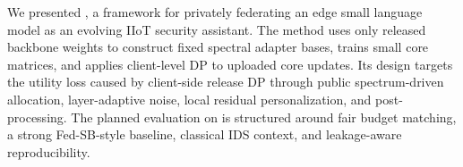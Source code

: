 We presented \method, a framework for privately federating an edge small language model as an evolving IIoT security assistant. The method uses only released backbone weights to construct fixed spectral adapter bases, trains small core matrices, and applies client-level DP to uploaded core updates. Its design targets the utility loss caused by client-side release DP through public spectrum-driven allocation, layer-adaptive noise, local residual personalization, and post-processing. The planned evaluation on \dataset is structured around fair budget matching, a strong Fed-SB-style baseline, classical IDS context, and leakage-aware reproducibility. 
